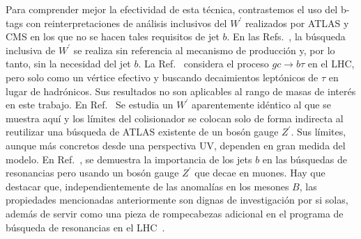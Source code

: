 Para comprender mejor la efectividad de esta técnica, contrastemos el uso del b-tags con reinterpretaciones de análisis inclusivos del $W^{\prime}$ realizados por ATLAS y CMS en los que no se hacen tales requisitos de jet $b$. En las Refs.~\cite{Khachatryan:2015pua, Aaboud:2018vgh}, la búsqueda inclusiva de $W^{\prime}$ se realiza sin referencia al mecanismo de producción y, por lo tanto, sin la necesidad del jet $b$. La Ref.~\cite{Altmannshofer:2017poe} considera el proceso $gc \to b \tau$ en el LHC, pero solo como un vértice efectivo y buscando decaimientos leptónicos de $\tau$ en lugar de hadrónicos. Sus resultados no son aplicables al rango de masas de interés en este trabajo. En Ref.~\cite{Asadi:2018wea} Se estudia un $W^{\prime}$ aparentemente idéntico al que se muestra aquí y los límites del colisionador se colocan solo de forma indirecta al reutilizar una búsqueda de ATLAS existente de un bosón gauge $Z^{\prime}$. Sus límites, aunque más concretos desde una perspectiva UV, dependen en gran medida del modelo. En Ref.~\cite{Dalchenko:2017shg}, se demuestra la importancia de los jets $b$ en las búsquedas de resonancias pero usando un bosón gauge $Z^{\prime}$ que decae en muones. Hay que destacar que, independientemente de las anomalías en los mesones $B$, las propiedades mencionadas anteriormente son dignas de investigación por si solas, además de servir como una pieza de rompecabezas adicional en el programa de búsqueda de resonancias en el LHC~\cite{Craig:2016rqv}.

